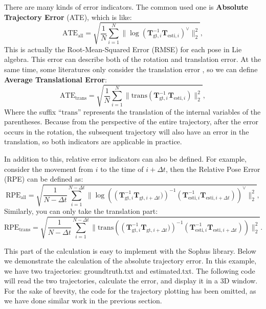 There are many kinds of error indicators. The common used one is \textbf{Absolute Trajectory Error} (ATE), which is like:
\begin{equation}
\mathrm{ATE}_{\mathrm{all}} = \sqrt{ \frac{1}{N} \sum_{i=1}^N \| \log( \mathbf{T}_{\mathrm{gt },i}^{-1} \mathbf{T}_{\mathrm{esti},i} )^{\vee} \|_2^2},
\end{equation}
This is actually the Root-Mean-Squared Error (RMSE) for each pose in Lie algebra. This error can describe both of the rotation and translation error. At the same time, some literatures only consider the translation error \cite{Sturm2012}, so we can define \textbf{Average Translational Error}:
\begin{equation}
\mathrm{ATE}_{\mathrm{trans}} = \sqrt{ \frac{1}{N} \sum_{i=1}^N \| \mathrm{trans}( \mathbf{T}_{\mathrm{gt},i}^{-1} \mathbf{T}_{\mathrm{esti},i} ) \|_2^2},
\end{equation}
Where the suffix ``$\mathrm{trans}$'' represents the translation of the internal variables of the parentheses. Because from the perspective of the entire trajectory, after the error occurs in the rotation, the subsequent trajectory will also have an error in the translation, so both indicators are applicable in practice.

In addition to this, relative error indicators can also be defined. For example, consider the movement from $i$ to the time of $i+\Delta t$, then the Relative Pose Error (RPE) can be defined as:
\begin{equation}
\mathrm{RPE}_{\mathrm{all}} = \sqrt{ \frac{1}{N-\Delta t} \sum_{i=1}^{N-\Delta t} \| \log \left ( \left(\mathbf{T}_{\mathrm{gt},i}^{-1} \mathbf{T}_{\mathrm{gt},i+\Delta t} )\right)^{-1 } \left(\mathbf{T}_{\mathrm{esti},i}^{-1} \mathbf{T}_{\mathrm{esti},i+\Delta t}\right)\right)^{ \vee} \|_2^2},
\end{equation}
Similarly, you can only take the translation part:
\begin{equation}
\mathrm{RPE}_{\mathrm{trans}} = \sqrt{ \frac{1}{N-\Delta t} \sum_{i=1}^{N-\Delta t} \| \mathrm{trans } \left( \left(\mathbf{T}_{\mathrm{gt},i}^{-1} \mathbf{T}_{\mathrm{gt},i+\Delta t} )\right)^ {-1} \left(\mathbf{T}_{\mathrm{esti},i}^{-1} \mathbf{T}_{\mathrm{esti},i+\Delta t}\right)\right ) \|_2^2}.
\end{equation}

This part of the calculation is easy to implement with the Sophus library. Below we demonstrate the calculation of the absolute trajectory error. In this example, we have two trajectories: groundtruth.txt and estimated.txt. The following code will read the two trajectories, calculate the error, and display it in a 3D window. For the sake of brevity, the code for the trajectory plotting has been omitted, as we have done similar work in the previous section.
    
